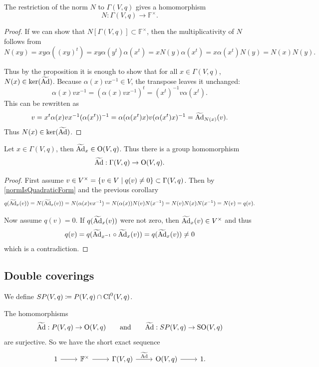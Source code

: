 \begin{corollary} \label{normHomomorphism}
The restriction of the norm $N$ to $\Gamma(V,q)$ gives a homomorphism
\[ N: \Gamma(V,q) \to \mathbb{F}^\times. \]
\end{corollary}
\begin{proof}
If we can show that $N[\Gamma(V,q)]\subset \mathbb{F}^\times$, then the multiplicativity of $N$ follows from
\[ N(xy) = xy\alpha((xy)^t) = xy\alpha(y^t)\alpha(x^t) = xN(y)\alpha(x^t) = x\alpha(x^t)N(y) = N(x)N(y). \]

Thus by the proposition it is enough to show that for all $x\in \Gamma(V,q)$, $N(x)\in \ker(\widetilde{\operatorname{Ad}})$. Because $\alpha(x)vx^{-1}\in V$, the transpose leaves it unchanged:
\[ \alpha(x)vx^{-1} = (\alpha(x)vx^{-1})^t = (x^t)^{-1}v\alpha(x^t). \]
This can be rewritten as
\[ v = x^t\alpha(x)vx^{-1}(\alpha(x^t))^{-1} = \alpha(\alpha(x^t)x)v(\alpha(x^t)x)^{-1} = \widetilde{\operatorname{Ad}}_{N(x)}(v). \]
Thus $N(x)\in \ker(\widetilde{\operatorname{Ad}})$.
\end{proof}
\begin{corollary}
Let $x\in \Gamma(V,q)$, then $\widetilde{\operatorname{Ad}}_x \in \operatorname{O}(V,q)$. Thus there is a group homomorphism
\[ \widetilde{\operatorname{Ad}}: \Gamma(V,q) \to \operatorname{O}(V,q). \]
\end{corollary}
\begin{proof}
First assume $v\in V^\times = \setbuilder{v\in V}{q(v)\neq 0}\subset \Gamma(V,q)$. Then by \ref{normIsQuadraticForm} and the previous corollary
\[ q(\widetilde{\operatorname{Ad}}_x(v)) = N(\widetilde{\operatorname{Ad}}_x(v)) = N(\alpha(x)vx^{-1}) = N(\alpha(x))N(v)N(x^{-1}) = N(v)N(x)N(x^{-1}) = N(v) = q(v). \]

Now assume $q(v) = 0$. If $q(\widetilde{\operatorname{Ad}}_x(v))$ were not zero, then $\widetilde{\operatorname{Ad}}_x(v)\in V^\times$ and thus
\[ q(v) = q(\widetilde{\operatorname{Ad}}_{x^{-1}}\circ\widetilde{\operatorname{Ad}}_x(v)) = q(\widetilde{\operatorname{Ad}}_x(v)) \neq 0 \]
which is a contradiction.
\end{proof}

\subsection{Double coverings}
We define $SP(V,q) \coloneqq P(V,q)\cap \operatorname{Cl}^0(V,q)$.
\begin{theorem}
The homomorphisms
\[ \widetilde{\operatorname{Ad}}: P(V,q)\to \operatorname{O}(V,q) \qquad \text{and} \qquad \widetilde{\operatorname{Ad}}: SP(V,q)\to \operatorname{SO}(V,q) \]
are surjective. So we have the short exact sequence
\[ \begin{tikzcd}
1 \rar & \F^\times \rar & \Gamma(V,q) \rar{\widetilde{\Ad}} & \Ogroup(V,q) \rar & 1.
\end{tikzcd} \]
\end{theorem}

